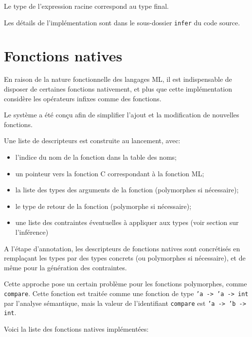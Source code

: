 \documentclass[paper=a4, fontsize=11pt]{scrartcl}
\numberwithin{equation}{section}		%
\numberwithin{figure}{section}			%
\numberwithin{table}{section}				%
\begin{document}
Le type de l'expression racine correspond au type final.


Les détails de l'implémentation sont dans le sous-dossier \texttt{infer} du code source.

\newpage
\section{Fonctions natives}

En raison de la nature fonctionnelle des langages ML, il est indispensable de disposer de certaines fonctions nativement, et plus que cette implémentation considère les opérateurs infixes comme des fonctions.

Le système a été conçu afin de simplifier l'ajout et la modification de nouvelles fonctions.

Une liste de descripteurs est construite au lancement, avec:
\begin{itemize}
\item l'indice du nom de la fonction dans la table des noms;
\item un pointeur vers la fonction C correspondant à la fonction ML;
\item la liste des types des arguments de la fonction (polymorphes si nécessaire);
\item le type de retour de la fonction (polymorphe si nécessaire);
\item une liste des contraintes éventuelles à appliquer aux types (voir section sur l'inférence)
\end{itemize}

A l'étape d'annotation, les descripteurs de fonctions natives sont concrétisés en remplaçant les types par des types concrets (ou polymorphes si nécessaire), et de même pour la génération des contraintes.

Cette approche pose un certain problème pour les fonctions polymorphes, comme \texttt{compare}.
Cette fonction est traitée comme une fonction de type \texttt{'a -> 'a -> int} par l'analyse sémantique, mais la valeur de l'identifiant \texttt{compare} est \texttt{'a -> 'b -> int}.

Voici la liste des fonctions natives implémentées:
\end{document}

